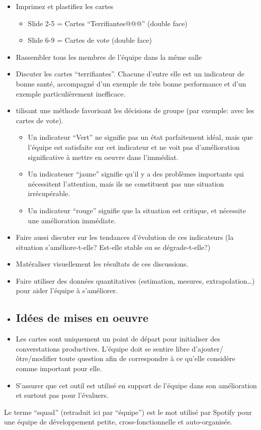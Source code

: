 \begin{itemize}
\item Imprimez et plastifiez les cartes


\begin{itemize}
\item Slide 2-5 = Cartes ``Terrifiantes@@@'' (double face)
\item Slide 6-9 = Cartes de vote (double face)
\end{itemize}
\item Rassembler tous les membres de l'équipe dans la même salle
\item Discuter les cartes ``terrifiantes''. Chacune d'entre elle est un indicateur de bonne santé, accompagné d'un exemple de très bonne performance et d'un exemple particulièrement inefficace.
\item tilisant une méthode favorisant les décisions de groupe (par exemple: avec les cartes de vote).


\begin{itemize}
\item Un indicateur ``Vert'' ne signifie pas un état parfaitement idéal, mais que l'équipe est satisfaite sur cet indicateur et ne voit pas d'amélioration significative à mettre en oeuvre dans l'immédiat.
\item Un indicateuer ``jaune'' signifie qu'il y a des problèmes importants qui nécessitent l'attention, mais ils ne constituent pas une situation irrécupérable.
\item Un indicateur ``rouge'' signifie que la situation est critique, et nécessite une amélioration immédiate.
\end{itemize}
\item Faire aussi discuter sur les tendances d'évolution de ces indicateurs (la situation s'améliore-t-elle? Est-elle stable ou se dégrade-t-elle?)
\item Matéraliser visuellement les résultats de ces discussions.
\item Faire utiliser des données quantitatives (estimation, mesures, extrapolation\ldots{}) pour aider l'équipe à s'améliorer.
\item \subsection{Idées de mises en oeuvre}
\item Les cartes sont uniquement un point de départ pour initialiser des converstations productives. L'équipe doit se sentire libre d'ajouter/ôtre/modifier toute question afin de correspondre à ce qu'elle considère comme important pour elle.
\item S'assurer que cet outil est utilisé en support de l'équipe dans son amélioration et surtout pas pour l'évaluers.
\end{itemize}

Le terme ``squad''  (retraduit ici par ``équipe'') est le mot utilisé par Spotify pour une équipe de développement petite, cross-fonctionnelle et auto-organisée.

